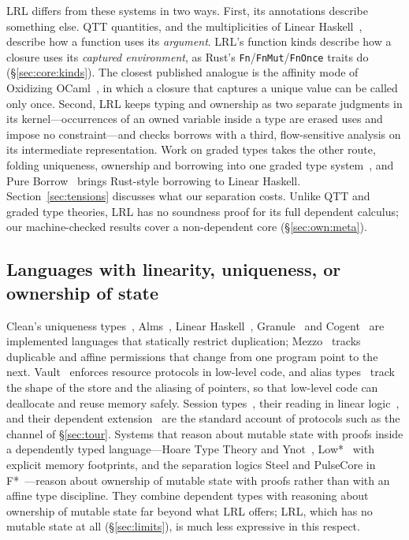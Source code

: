 LRL differs from these systems in two ways.
First, its annotations describe something else.
QTT quantities, and the multiplicities of Linear Haskell~\cite{bernardy2018}, describe how a function uses its \emph{argument}.
LRL's function kinds describe how a closure uses its \emph{captured environment}, as Rust's \lstinline|Fn|/\lstinline|FnMut|/\lstinline|FnOnce| traits do (\S\ref{sec:core:kinds}).
The closest published analogue is the affinity mode of Oxidizing OCaml~\cite{lorenzen2024oxidizing}, in which a closure that captures a unique value can be called only once.
Second, LRL keeps typing and ownership as two separate judgments in its kernel---occurrences of an owned variable inside a type are erased uses and impose no constraint---and checks borrows with a third, flow-sensitive analysis on its intermediate representation.
Work on graded types takes the other route, folding uniqueness, ownership and borrowing into one graded type system~\cite{marshall2022,marshall2024fractional}, and Pure Borrow~\cite{matsushita2026pureborrow} brings Rust-style borrowing to Linear Haskell.
Section~\ref{sec:tensions} discusses what our separation costs.
Unlike QTT and graded type theories, LRL has no soundness proof for its full dependent calculus; our machine-checked results cover a non-dependent core (\S\ref{sec:own:meta}).

\subsection{Languages with linearity, uniqueness, or ownership of state}\label{sec:related:lang}

Clean's uniqueness types~\cite{barendsen1993conventional,barendsen1996uniqueness}, Alms~\cite{tov2011practical}, Linear Haskell~\cite{bernardy2018}, Granule~\cite{orchard2019granule} and Cogent~\cite{oconnor2016cogent} are implemented languages that statically restrict duplication; Mezzo~\cite{pottier2013mezzo,balabonski2016mezzo} tracks duplicable and affine permissions that change from one program point to the next.
Vault~\cite{deline2001vault} enforces resource protocols in low-level code, and alias types~\cite{smith2000alias} track the shape of the store and the aliasing of pointers, so that low-level code can deallocate and reuse memory safely.
Session types~\cite{honda1998session}, their reading in linear logic~\cite{caires2010session,wadler2012sessions}, and their dependent extension~\cite{toninho2011dependent} are the standard account of protocols such as the channel of \S\ref{sec:tour}.
Systems that reason about mutable state with proofs inside a dependently typed language---Hoare Type Theory and Ynot~\cite{nanevski2006htt,nanevski2008htt,nanevski2008ynot}, Low*~\cite{protzenko2017lowstar} with explicit memory footprints, and the separation logics Steel and PulseCore in F*~\cite{swamy2016fstar,swamy2020steelcore,fromherz2021steel,ebner2025pulsecore}---reason about ownership of mutable state with proofs rather than with an affine type discipline.
They combine dependent types with reasoning about ownership of mutable state far beyond what LRL offers; LRL, which has no mutable state at all (\S\ref{sec:limits}), is much less expressive in this respect.

